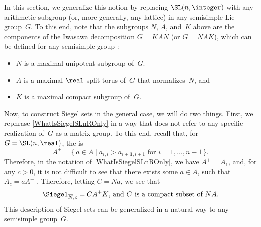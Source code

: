 In this section, we generalize this notion by replacing $\SL(n,\integer)$ with any arithmetic subgroup (or, more generally, any lattice) in any semisimple Lie group~$G$.
To this end, note that the subgroups $N$, $A$, and~$K$ above are the components of the Iwasawa decomposition $G = KAN$ (or $G = NAK$), which can be defined for any semisimple group :
	\noprelistbreak
	\begin{itemize}
	\item %
	$N$ is a {maximal} unipotent subgroup of~$G$.
	\item %
	$A$ is a {maximal} $\real$-split torus of~$G$ that normalizes~$N$,
	and
	\item %
	$K$ is a {maximal} compact subgroup of~$G$.
	\end{itemize}
%
%

Now, to construct Siegel sets in the general case, we will do two things. First, we rephrase \cref{WhatIsSiegelSLnROnly} in a way that does not refer to any specific realization of~$G$ as a matrix group. To this end, recall that, for $G = \SL(n,\real)$, the \emph{} is
	$$ A^+ = \{\, a \in A \mid \text{$a_{i,i} > a_{i+1,i+1}$ for $i = 1,\ldots,n-1$} \,\} . $$
Therefore, in the notation of \cref{WhatIsSiegelSLnROnly}, we have
	$ A^+ = A_1 $, and, for any $c > 0$, it is not difficult to see that there exists some $a \in A$, such that $A_c =  a A^+$ .
Therefore, letting $C = \overline{N} a$, we see that 
	$$ \text{$\Siegel_{\overline{N},c} = C A^+ K$, and $C$ is a compact subset of~$NA$.} $$
This description of Siegel sets can be generalized in a natural way to any semisimple group~$G$. 

